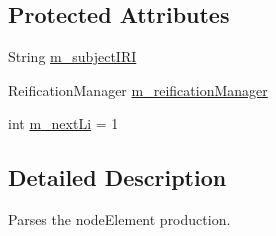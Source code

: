 \subsection*{Protected Attributes}
\begin{DoxyCompactItemize}
\item 
String \hyperlink{classorg_1_1semanticweb_1_1owlapi_1_1rdf_1_1syntax_1_1_r_d_f_parser_1_1_node_element_a89ba49419b7d16f00594dfd813eb995d}{m\-\_\-subject\-I\-R\-I}
\item 
Reification\-Manager \hyperlink{classorg_1_1semanticweb_1_1owlapi_1_1rdf_1_1syntax_1_1_r_d_f_parser_1_1_node_element_a800102f236804042a6649bd92b731b9b}{m\-\_\-reification\-Manager}
\item 
int \hyperlink{classorg_1_1semanticweb_1_1owlapi_1_1rdf_1_1syntax_1_1_r_d_f_parser_1_1_node_element_afa88025c467c0d6b851a7f5f9c8d6727}{m\-\_\-next\-Li} = 1
\end{DoxyCompactItemize}


\subsection{Detailed Description}
Parses the node\-Element production. 

